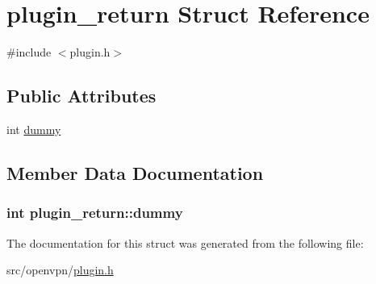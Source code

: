 \hypertarget{structplugin__return}{}\section{plugin\+\_\+return Struct Reference}
\label{structplugin__return}


{\ttfamily \#include $<$plugin.\+h$>$}

\subsection*{Public Attributes}
\begin{DoxyCompactItemize}
\item 
int \hyperlink{structplugin__return_adba9b90299dd082a8d86cc8911bac472}{dummy}
\end{DoxyCompactItemize}


\subsection{Member Data Documentation}
\hypertarget{structplugin__return_adba9b90299dd082a8d86cc8911bac472}{}
\subsubsection[{dummy}]{\setlength{\rightskip}{0pt plus 5cm}int plugin\+\_\+return\+::dummy}\label{structplugin__return_adba9b90299dd082a8d86cc8911bac472}


The documentation for this struct was generated from the following file\+:\begin{DoxyCompactItemize}
\item 
src/openvpn/\hyperlink{plugin_8h}{plugin.\+h}\end{DoxyCompactItemize}
